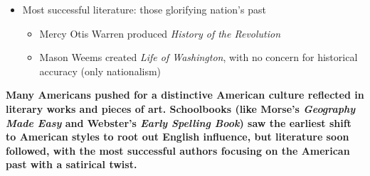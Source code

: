\documentclass[a4paper]{article}
\begin{document}
{\begin{itemize}
\begin{itemize}
\begin{itemize}
                    \begin{itemize}
                        \item Obsession with originality -> lacked large popular following
                    \end{itemize}
                \end{itemize}
                \item Most successful author: Washington Irving, producing satirical histories of early American life, New World society
                \begin{itemize}
                    \item Wrote stories about adventures of early Americans, with work still read today 
                \end{itemize}
            \end{itemize}
            \item Most successful literature: those glorifying nation's past
            \begin{itemize}
                \item Mercy Otis Warren produced \textit{History of the Revolution}
                \item Mason Weems created \textit{Life of Washington}, with no concern for historical accuracy (only nationalism)
            \end{itemize}
        \end{itemize}
        \textbf{Many Americans pushed for a distinctive American culture reflected in literary works and pieces of art. Schoolbooks (like Morse's \textit{Geography Made Easy} and Webster's \textit{Early Spelling Book}) saw the earliest shift to American styles to root out English influence, but literature soon followed, with the most successful authors focusing on the American past with a satirical twist.}}
\end{document}

